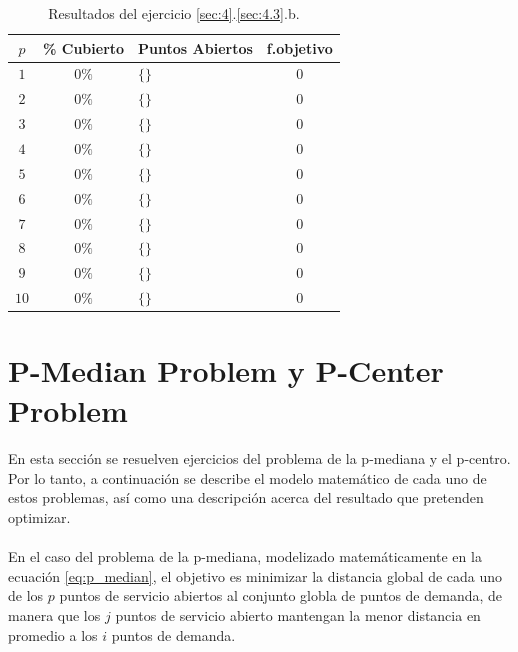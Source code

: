 \documentclass[spanish]{article}
\begin{document}
			\begin{table}[h]
				\begin{center}
					\begin{tabular}{|c || c || l || c | }
						\hline
						$p$		&	\% Cubierto	& Puntos Abiertos 					& f.objetivo \\ \hline \hline
						$1$ 	& $0\%$ & $\{\}$ 										& $0$ \\ \hline
						$2$ 	& $0\%$ & $\{\}$ 										& $0$ \\ \hline
						$3$ 	& $0\%$ & $\{\}$ 										& $0$ \\ \hline
						$4$ 	& $0\%$ & $\{\}$ 										& $0$ \\ \hline
						$5$ 	& $0\%$ & $\{\}$ 										& $0$ \\ \hline
						$6$ 	& $0\%$ & $\{\}$ 										& $0$ \\ \hline
						$7$ 	& $0\%$ & $\{\}$ 										& $0$ \\ \hline
						$8$ 	& $0\%$ & $\{\}$ 										& $0$ \\ \hline
						$9$ 	& $0\%$ & $\{\}$ 										& $0$ \\ \hline
						$10$ 	& $0\%$ & $\{\}$ 										& $0$ \\
						\hline
					\end{tabular}
				\end{center}
				\caption{Resultados del ejercicio \ref{sec:4}.\ref{sec:4.3}.b.}
				\label{table:sol-4.3b}
			\end{table}

	\section{P-Median Problem y P-Center Problem}
	\label{sec:5}

		\paragraph{}
		En esta sección se resuelven ejercicios del problema de la p-mediana y el p-centro. Por lo tanto, a continuación se describe el modelo matemático de cada uno de estos problemas, así como una descripción acerca del resultado que pretenden optimizar.


		\paragraph{}
		En el caso del problema de la p-mediana, modelizado matemáticamente en la ecuación \ref{eq:p_median}, el objetivo es minimizar la distancia global de cada uno de los $p$ puntos de servicio abiertos al conjunto globla de puntos de demanda, de manera que los $j$ puntos de servicio abierto mantengan la menor distancia en promedio a los $i$ puntos de demanda.
\end{document}
